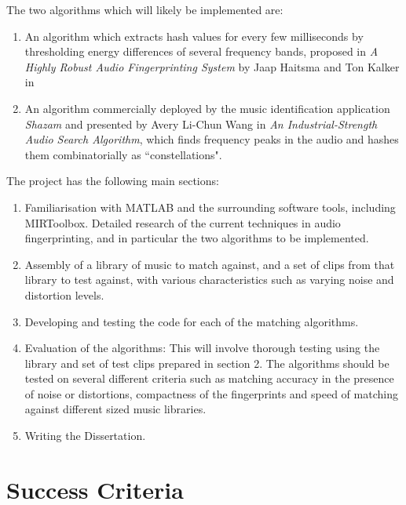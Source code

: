 \documentclass[12pt]{article}
\begin{document}
The two algorithms which will likely be implemented are:

\begin{enumerate}

\item An algorithm which extracts hash values for every few milliseconds by thresholding energy differences of several frequency bands, proposed in \emph{A Highly Robust Audio Fingerprinting System} by Jaap Haitsma and Ton Kalker in 

\item An algorithm commercially deployed by the music identification application \emph{Shazam} and presented by Avery Li-Chun Wang in \emph{An Industrial-Strength Audio Search Algorithm}, which finds frequency peaks in the audio and hashes them combinatorially as ``constellations".

\end{enumerate}

The project has the following main sections:

\begin{enumerate}

\item Familiarisation with MATLAB and the surrounding software tools, including MIRToolbox. Detailed research of the current techniques in audio fingerprinting, and in particular the two algorithms to be implemented. 

\item Assembly of a library of music to match against, and a set of clips from that library to test against, with various characteristics such as varying noise and distortion levels.

\item Developing and testing the code for each of the matching algorithms.

\item Evaluation of the algorithms: This will involve thorough testing using the library and set of test clips prepared in section 2. The algorithms should be tested on several different criteria such as matching accuracy in the presence of noise or distortions, compactness of the fingerprints and speed of matching against different sized music libraries.

\item Writing the Dissertation.

\end{enumerate}


\section*{Success Criteria}
\end{document}
